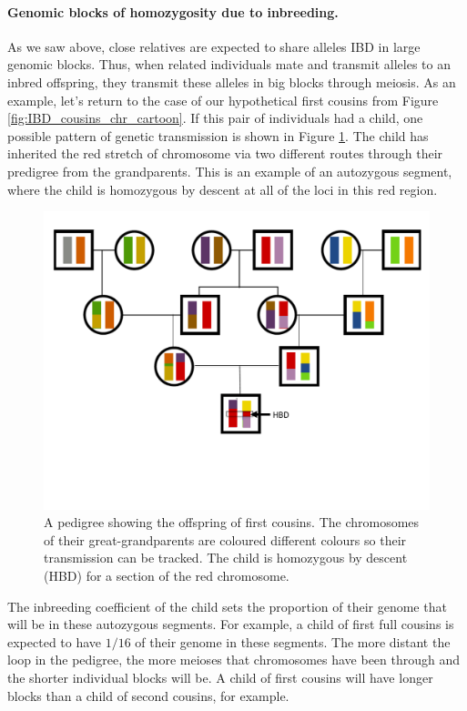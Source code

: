 {{%



  \paragraph{Genomic blocks of homozygosity due to inbreeding.}

As we saw above, close relatives are expected to share alleles IBD in
large genomic blocks. Thus, when related individuals mate and transmit
alleles to an inbred offspring, they transmit these alleles in big
blocks through meiosis. As an example, let's return to the case of our
hypothetical first cousins from Figure
\ref{fig:IBD_cousins_chr_cartoon}. If this pair of individuals had a
child, one possible pattern of genetic transmission is shown in Figure
\ref{fig:kid_first_cousins}. The child has inherited the red stretch
of chromosome via two different routes through their predigree from
the grandparents. This is an example of an autozygous
segment, where the child is homozygous by descent at all of the loci in this
red region.
  \begin{figure}
  \begin{center}
    \includegraphics[width= 0.75 \textwidth]{figures/sharing_relatives/first_cousin_offspring.pdf}
\end{center}
\caption{A pedigree showing the offspring of first cousins. The
  chromosomes of their great-grandparents are coloured different colours
so their transmission can be tracked. The child is homozygous by
descent (HBD) for a section of the red chromosome.} \label{fig:kid_first_cousins}
\end{figure}
The inbreeding coefficient of the child sets the proportion of their
genome that will be in these autozygous segments. For example, a child
of first full cousins is expected to have $1/16$ of their
genome in these segments.
The more distant the loop in the pedigree, the more meioses that
chromosomes have been through and the shorter individual blocks will be. A
child of first cousins will have longer blocks than a child of second
cousins, for example.

}}
